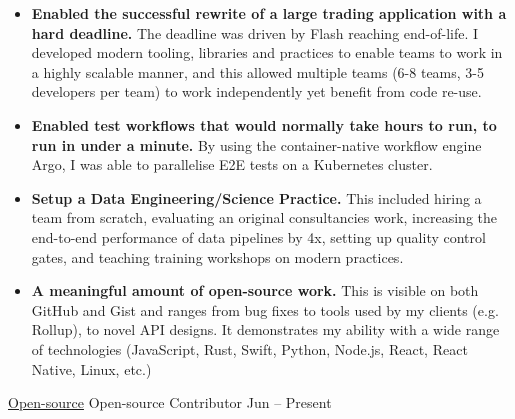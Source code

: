 \documentclass[10pt,a4paper]{article}
\begin{document}
\begin{indentsection}
\item
\begin{itemize}[leftmargin=0cm]

    \item \textbf{Enabled the successful rewrite of a large trading application with a hard deadline.} The deadline was driven by Flash reaching end-of-life. I developed modern tooling, libraries and practices to enable teams to work in a highly scalable manner, and this allowed multiple teams (6-8 teams, 3-5 developers per team) to work independently yet benefit from code re-use.

    \item \textbf{Enabled test workflows that would normally take hours to run, to run in under a minute.} By using the container-native workflow engine Argo, I was able to parallelise E2E tests on a Kubernetes cluster.

    \item \textbf{Setup a Data Engineering/Science Practice.} This included hiring a team from scratch, evaluating an original consultancies work, increasing the end-to-end performance of data pipelines by 4x, setting up quality control gates, and teaching training workshops on modern practices.

    \item \textbf{A meaningful amount of open-source work.} This is visible on both GitHub and Gist and ranges from bug fixes to tools used by my clients (e.g. Rollup), to novel API designs. It demonstrates my ability with a wide range of technologies (JavaScript, Rust, Swift, Python, Node.js, React, React Native, Linux, etc.)

\end{itemize}
\end{indentsection}


\headedsection  %
  {\href{http://github.com/sebinsua}{Open-source}}
  {} {%
  \headedsubsection  %
    {Open-source Contributor}
    {Jun  -- Present}
    {}
}
\end{document}
